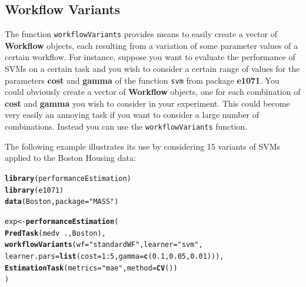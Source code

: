 \documentclass[10pt,a4paper]{article}\usepackage[]{graphicx}\usepackage[]{color}
\makeatletter
\newcommand{\hlnum}[1]{\textcolor[rgb]{0.686,0.059,0.569}{#1}}%
\newcommand{\hlstr}[1]{\textcolor[rgb]{0.192,0.494,0.8}{#1}}%
\newcommand{\hlopt}[1]{\textcolor[rgb]{0,0,0}{#1}}%
\newcommand{\hlstd}[1]{\textcolor[rgb]{0.345,0.345,0.345}{#1}}%
\newcommand{\hlkwb}[1]{\textcolor[rgb]{0.69,0.353,0.396}{#1}}%
\newcommand{\hlkwc}[1]{\textcolor[rgb]{0.333,0.667,0.333}{#1}}%
\newcommand{\hlkwd}[1]{\textcolor[rgb]{0.737,0.353,0.396}{\textbf{#1}}}%
\newenvironment{kframe}{%
 \def\at@end@of@kframe{}%
 \ifinner\ifhmode%
  \def\at@end@of@kframe{\end{minipage}}%
  \begin{minipage}{\columnwidth}%
 \fi\fi%
 \def\FrameCommand##1{\hskip\@totalleftmargin \hskip-\fboxsep
 \colorbox{shadecolor}{##1}\hskip-\fboxsep
     \hskip-\linewidth \hskip-\@totalleftmargin \hskip\columnwidth}%
 \MakeFramed {\advance\hsize-\width
   \@totalleftmargin\z@ \linewidth\hsize
   \@setminipage}}%
 {\par\unskip\endMakeFramed%
 \at@end@of@kframe}
\newenvironment{knitrout}{}{} %
\makeatother
\begin{document}
\subsection{Workflow Variants}\label{sec:variants}

The function \texttt{workflowVariants}  provides  means to easily create a vector of \textbf{Workflow} objects, each resulting from a variation of some parameter values of a certain workflow. For instance, suppose you want to evaluate the performance of SVMs on a certain task and you wish to consider a certain range of values for the parameters \textbf{cost} and \textbf{gamma} of the function \texttt{svm} from package \textbf{e1071}. You could obviously create a vector of \textbf{Workflow} objects, one for each combination of \textbf{cost} and \textbf{gamma} you wish to consider in your experiment. This could become very easily an annoying task if you want to consider a large number of combinations. Instead you can use the \texttt{workflowVariants} function.

The following example illustrates its use by considering 15 variants of SVMs applied to the Boston Housing data:


\begin{knitrout}\footnotesize
{}\color{fgcolor}\begin{kframe}
\begin{alltt}
\hlkwd{library}\hlstd{(performanceEstimation)}
\hlkwd{library}\hlstd{(e1071)}
\hlkwd{data}\hlstd{(Boston,}\hlkwc{package}\hlstd{=}\hlstr{"MASS"}\hlstd{)}

\hlstd{exp} \hlkwb{<-} \hlkwd{performanceEstimation}\hlstd{(}
         \hlkwd{PredTask}\hlstd{(medv} \hlopt{~} \hlstd{.,Boston),}
         \hlkwd{workflowVariants}\hlstd{(}\hlkwc{wf}\hlstd{=}\hlstr{"standardWF"}\hlstd{,}\hlkwc{learner}\hlstd{=}\hlstr{"svm"}\hlstd{,}
                          \hlkwc{learner.pars}\hlstd{=}\hlkwd{list}\hlstd{(}\hlkwc{cost}\hlstd{=}\hlnum{1}\hlopt{:}\hlnum{5}\hlstd{,}\hlkwc{gamma}\hlstd{=}\hlkwd{c}\hlstd{(}\hlnum{0.1}\hlstd{,}\hlnum{0.05}\hlstd{,}\hlnum{0.01}\hlstd{))),}
         \hlkwd{EstimationTask}\hlstd{(}\hlkwc{metrics}\hlstd{=}\hlstr{"mae"}\hlstd{,}\hlkwc{method}\hlstd{=}\hlkwd{CV}\hlstd{())}
         \hlstd{)}
\end{alltt}
\end{kframe}
\end{knitrout}
\end{document}
